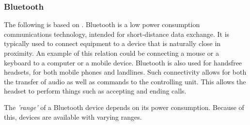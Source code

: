 \subsubsection{Bluetooth}
The following is based on \citet{ieee_bluetooth_standard}.
Bluetooth is a low power consumption communications technology, intended for short-distance data exchange.
It is typically used to connect equipment to a device that is naturally close in proximity.
An example of this relation could be connecting a mouse or a keyboard to a computer or a mobile device.
Bluetooth is also used for handsfree headsets, for both mobile phones and landlines.
Such connectivity allows for both the transfer of audio as well as commands to the controlling unit.
This allows the headset to perform things such as accepting and ending calls.

The \textit{'range'} of a Bluetooth device depends on its power consumption.
Because of this, devices are available with varying ranges.